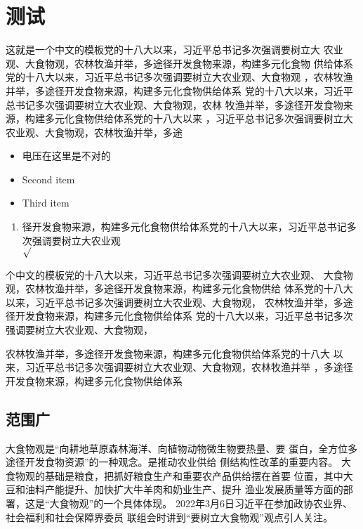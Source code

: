 \chapter{测试}

这就是一个中文的模板党的十八大以来，习近平总书记多次强调要树立大
农业观、大食物观，农林牧渔并举，多途径开发食物来源，构建多元化食物
供给体系党的十八大以来，习近平总书记多次强调要树立大农业观、大食物观
，农林牧渔并举，多途径开发食物来源，构建多元化食物供给体系
党的十八大以来，习近平总书记多次强调要树立大农业观、大食物观，农林
牧渔并举，多途径开发食物来源，构建多元化食物供给体系党的十八大以来
，习近平总书记多次强调要树立大农业观、大食物观，农林牧渔并举，多途
\begin{itemize}
	\kaishu
	\item 电压在这里是不对的
	\item Second item
	\item Third item
  \end{itemize}


  \begin{enumerate}
	\item  径开发食物来源，构建多元化食物供给体系党的十八大以来，习近平总书记多次强调要树立大农业观\\
			$\surd$
	
  \end{enumerate}
个中文的模板党的十八大以来，习近平总书记多次强调要树立大农业观、
大食物观，农林牧渔并举，多途径开发食物来源，构建多元化食物供给
体系党的十八大以来，习近平总书记多次强调要树立大农业观、大食物观，
农林牧渔并举，多途径开发食物来源，构建多元化食物供给体系
党的十八大以来，习近平总书记多次强调要树立大农业观、大食物观，

农林牧渔并举，多途径开发食物来源，构建多元化食物供给体系党的十八大
以来，习近平总书记多次强调要树立大农业观、大食物观，农林牧渔并举
，多途径开发食物来源，构建多元化食物供给体系
	\section{范围广}
	大食物观是“向耕地草原森林海洋、向植物动物微生物要热量、要
	蛋白，全方位多途径开发食物资源”的一种观念。是推动农业供给
	侧结构性改革的重要内容。
大食物观的基础是粮食，把抓好粮食生产和重要农产品供给摆在首要
位置，其中大豆和油料产能提升、加快扩大牛羊肉和奶业生产、提升
渔业发展质量等方面的部署，这是“大食物观”的一个具体体现。
2022年3月6日习近平在参加政协农业界、社会福利和社会保障界委员
联组会时讲到“要树立大食物观”观点引人关注。
